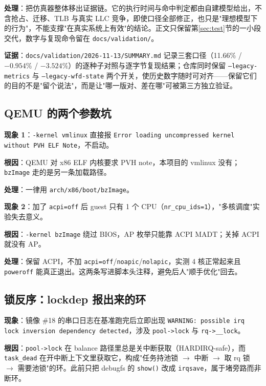 \textbf{处理}：把仿真器整体移出证据链。它的执行时间与命中判定都由自建模型给出，不含抢占、迁移、TLB 与真实 LLC 竞争，即使口径全部修正，也只是"理想模型下的行为"，不能支撑"在真实系统上有效"的结论。正文只保留第\ref{sec:test}节的一小段交代，数字与复现命令留在 \texttt{docs/validation/}。

\textbf{证据}：\texttt{docs/validation/2026-11-13/SUMMARY.md} 记录三套口径（11.66\% / $-0.954\%$ / $-3.524\%$）的逐种子对照与逐字节复现结果；仓库同时保留 \texttt{--legacy-metrics} 与 \texttt{--legacy-wfd-state} 两个开关，使历史数字随时可对齐——保留它们的目的不是"留个说法"，而是让"哪一版对、差在哪"可被第三方独立验证。

\subsection{QEMU 的两个参数坑}

\textbf{现象 1}：\texttt{-kernel vmlinux} 直接报 \texttt{Error loading uncompressed kernel without PVH ELF Note}，不启动。

\textbf{根因}：QEMU 对 x86 ELF 内核要求 PVH note，本项目的 vmlinux 没有；\texttt{bzImage} 走的是另一条加载路径。

\textbf{处理}：一律用 \texttt{arch/x86/boot/bzImage}。

\textbf{现象 2}：加了 \texttt{acpi=off} 后 guest 只有 1 个 CPU（\texttt{nr\_cpu\_ids=1}），"多核调度"实验失去意义。

\textbf{根因}：\texttt{-kernel bzImage} 绕过 BIOS，AP 枚举只能靠 ACPI MADT；关掉 ACPI 就没有 AP。

\textbf{处理}：保留 ACPI，不加 \texttt{acpi=off}/\texttt{noapic}/\texttt{nolapic}，实测 4 核正常起来且 \texttt{poweroff} 能真正退出。这两条写进脚本头注释，避免后人"顺手优化"回去。

\subsection{锁反序：lockdep 报出来的环}

\textbf{现象}：镜像 \#18 的串口日志在基准跑完后立即出现 \texttt{WARNING: possible irq lock inversion dependency detected}，涉及 \texttt{pool->lock} 与 \texttt{rq->\_\_lock}。

\textbf{根因}：\texttt{pool->lock} 在 balance 路径里总是关中断获取（HARDIRQ-safe），而 \texttt{task\_dead} 在开中断上下文里获取它，构成"任务持池锁 $\to$ 中断 $\to$ 取 rq 锁 $\to$ 需要池锁"的环。此前只把 debugfs 的 \texttt{show()} 改成 \texttt{irqsave}，属于堵旁路而非断环。

